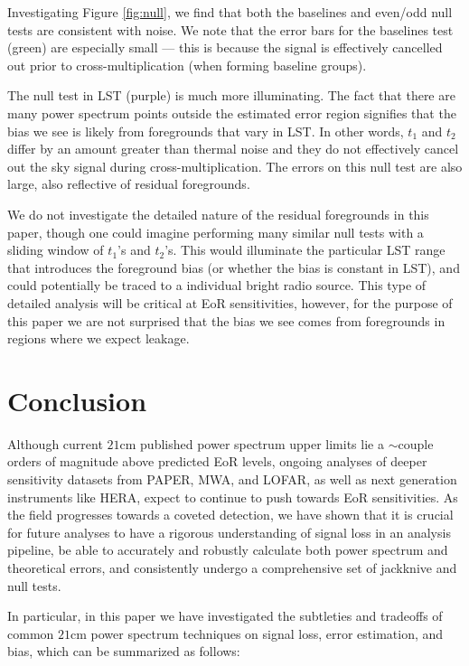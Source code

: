 \documentclass[preprint2,numberedappendix,tighten]{aastex6}  %
\begin{document}
Investigating Figure \ref{fig:null}, we find that both the baselines and even/odd null tests are consistent with noise. We note that the error bars for the baselines test (green) are especially small --- this is because the signal is effectively cancelled out prior to cross-multiplication (when forming baseline groups). 

The null test in LST (purple) is much more illuminating. The fact that there are many power spectrum points outside the estimated error region signifies that the bias we see is likely from foregrounds that vary in LST. In other words, $t_{1}$ and $t_{2}$ differ by an amount greater than thermal noise and they do not effectively cancel out the sky signal during cross-multiplication. The errors on this null test are also large, also reflective of residual foregrounds. 

We do not investigate the detailed nature of the residual foregrounds in this paper, though one could imagine performing many similar null tests with a sliding window of $t_{1}$'s and $t_{2}$'s. This would illuminate the particular LST range that introduces the foreground bias (or whether the bias is constant in LST), and could potentially be traced to a individual bright radio source. This type of detailed analysis will be critical at EoR sensitivities, however, for the purpose of this paper we are not surprised that the bias we see comes from foregrounds in regions where we expect leakage.


\section{Conclusion}
\label{sec:Con}

Although current $21$cm published power spectrum upper limits lie a $\sim$couple orders of magnitude above predicted EoR levels, ongoing analyses of deeper sensitivity datasets from PAPER, MWA, and LOFAR, as well as next generation instruments like HERA, expect to continue to push towards EoR sensitivities. As the field progresses towards a coveted detection, we have shown that it is crucial for future analyses to have a rigorous understanding of signal loss in an analysis pipeline, be able to accurately and robustly calculate both power spectrum and theoretical errors, and consistently undergo a comprehensive set of jackknive and null tests.

In particular, in this paper we have investigated the subtleties and tradeoffs of common $21$cm power spectrum techniques on signal loss, error estimation, and bias, which can be summarized as follows:
\end{document}
